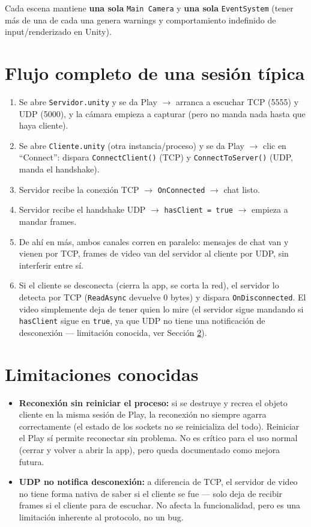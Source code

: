 \documentclass[11pt,a4paper]{article}
\begin{document}
Cada escena mantiene \textbf{una sola} \texttt{Main Camera} y \textbf{una sola}
\texttt{EventSystem} (tener más de una de cada una genera warnings y comportamiento
indefinido de input/renderizado en Unity).

\section{Flujo completo de una sesión típica}

\begin{enumerate}
  \item Se abre \texttt{Servidor.unity} y se da Play $\rightarrow$ arranca a escuchar TCP (5555) y UDP (5000), y la cámara empieza a capturar (pero no manda nada hasta que haya cliente).
  \item Se abre \texttt{Cliente.unity} (otra instancia/proceso) y se da Play $\rightarrow$ clic en ``Connect'': dispara \texttt{ConnectClient()} (TCP) y \texttt{ConnectToServer()} (UDP, manda el handshake).
  \item Servidor recibe la conexión TCP $\rightarrow$ \texttt{OnConnected} $\rightarrow$ chat listo.
  \item Servidor recibe el handshake UDP $\rightarrow$ \texttt{hasClient = true} $\rightarrow$ empieza a mandar frames.
  \item De ahí en más, ambos canales corren en paralelo: mensajes de chat van y vienen por TCP, frames de video van del servidor al cliente por UDP, sin interferir entre sí.
  \item Si el cliente se desconecta (cierra la app, se corta la red), el servidor lo detecta por TCP (\texttt{ReadAsync} devuelve 0 bytes) y dispara \texttt{OnDisconnected}. El video simplemente deja de tener quien lo mire (el servidor sigue mandando si \texttt{hasClient} sigue en \texttt{true}, ya que UDP no tiene una notificación de desconexión — limitación conocida, ver Sección \ref{sec:limitaciones}).
\end{enumerate}

\section{Limitaciones conocidas}
\label{sec:limitaciones}

\begin{itemize}
  \item \textbf{Reconexión sin reiniciar el proceso:} si se destruye y recrea el objeto cliente en la misma sesión de Play, la reconexión no siempre agarra correctamente (el estado de los sockets no se reinicializa del todo). Reiniciar el Play sí permite reconectar sin problema. No es crítico para el uso normal (cerrar y volver a abrir la app), pero queda documentado como mejora futura.
  \item \textbf{UDP no notifica desconexión:} a diferencia de TCP, el servidor de video no tiene forma nativa de saber si el cliente se fue — solo deja de recibir frames si el cliente para de escuchar. No afecta la funcionalidad, pero es una limitación inherente al protocolo, no un bug.
\end{itemize}
\end{document}
